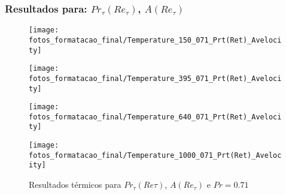 \documentclass[xcolor=dvipsnames,10pt,aspectratio=169]{beamer}
\begin{document}
    \begin{frame}
		\frametitle{Resultados para: $Pr_\tau(Re_\tau)$, $A(Re_\tau)$}
      \begin{figure}[!h]
        \centering
        \begin{minipage}[t]{0.5\textwidth}
          \centering
          \texttt{[image: fotos\_formatacao\_final/Temperature\_150\_071\_Prt(Ret)\_Avelocity]}
          \caption{$Re_\tau = 150$, $L2_t = 0.212$}
        \end{minipage}
        \begin{minipage}[t]{0.45\textwidth}
          \centering
          \texttt{[image: fotos\_formatacao\_final/Temperature\_395\_071\_Prt(Ret)\_Avelocity]}
          \caption{$Re_\tau = 395$, $L2_t = 0.233$}
        \end{minipage}
        \begin{minipage}[t]{0.5\textwidth}
          \centering
          \texttt{[image: fotos\_formatacao\_final/Temperature\_640\_071\_Prt(Ret)\_Avelocity]}
          \caption{$Re_\tau = 640$, $L2_t = 0.205$}
        \end{minipage}
        \begin{minipage}[t]{0.45\textwidth}
          \centering
          \texttt{[image: fotos\_formatacao\_final/Temperature\_1000\_071\_Prt(Ret)\_Avelocity]}
          \caption{$Re_\tau = 1020$, $L2_t = 0.175$}
        \end{minipage}	
        \caption{Resultados térmicos para $Pr_\tau(Re\tau)$, $A(Re_\tau)$ e $Pr =0.71$ }
      \end{figure}
		\end{frame}
\end{document}
